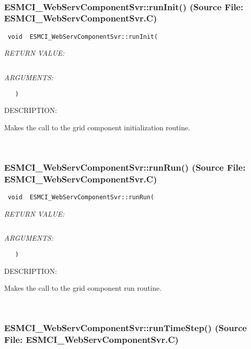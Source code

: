  
\mbox{}\hrulefill\
 
\subsubsection{ESMCI\_WebServComponentSvr::runInit() (Source File: ESMCI\_WebServComponentSvr.C)}


  
\begin{verbatim} void  ESMCI_WebServComponentSvr::runInit(\end{verbatim}{\em RETURN VALUE:}
\begin{verbatim} \end{verbatim}{\em ARGUMENTS:}
\begin{verbatim}   )\end{verbatim}
{\sf DESCRIPTION:\\ }


      Makes the call to the grid component initialization routine.
   
 
\mbox{}\hrulefill\
 
\subsubsection{ESMCI\_WebServComponentSvr::runRun() (Source File: ESMCI\_WebServComponentSvr.C)}


  
\begin{verbatim} void  ESMCI_WebServComponentSvr::runRun(\end{verbatim}{\em RETURN VALUE:}
\begin{verbatim} \end{verbatim}{\em ARGUMENTS:}
\begin{verbatim}   )\end{verbatim}
{\sf DESCRIPTION:\\ }


      Makes the call to the grid component run routine.
   
 
\mbox{}\hrulefill\
 
\subsubsection{ESMCI\_WebServComponentSvr::runTimeStep() (Source File: ESMCI\_WebServComponentSvr.C)}


